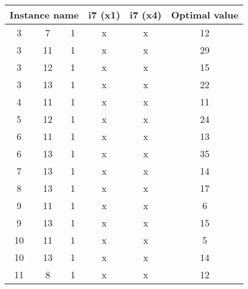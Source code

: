 \begin{table}[H]
\centering
	\begin{tabular}{cccccc}
		\multicolumn{3}{c}{Instance name}
					& i7 (x1)	& i7 (x4)	& Optimal value \\
		\midrule
		 3 &  7 & 1	& x			& x			& 12 \\
		 3 & 11 & 1	& x			& x			& 29 \\
		 3 & 12 & 1	& x			& x			& 15 \\
		 3 & 13 & 1	& x			& x			& 22 \\
		 4 & 11 & 1	& x			& x			& 11 \\
		 5 & 12 & 1	& x			& x			& 24 \\
		 6 & 11 & 1	& x			& x			& 13 \\
		 6 & 13 & 1	& x			& x			& 35 \\
		 7 & 13 & 1	& x			& x			& 14 \\
		 8 & 13 & 1	& x			& x			& 17 \\
		 9 & 11 & 1	& x			& x			&  6 \\
		 9 & 13 & 1	& x			& x			& 15 \\
		10 & 11 & 1	& x			& x			&  5 \\
		10 & 13 & 1	& x			& x			& 14 \\
		11 &  8 & 1	& x			& x			& 12 \\
	\end{tabular}
	\label{table:LP-results:suboptimalinstances}
\end{table}

